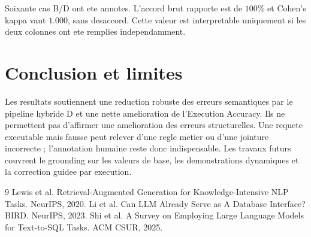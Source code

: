 \documentclass[11pt,a4paper]{article}
\begin{document}
Soixante cas B/D ont ete annotes. L'accord brut rapporte est de $100\%$ et
Cohen's kappa vaut $1.000$, sans desaccord. Cette valeur est interpretable
uniquement si les deux colonnes ont ete remplies independamment.

\section{Conclusion et limites}
Les resultats soutiennent une reduction robuste des erreurs semantiques par le
pipeline hybride D et une nette amelioration de l'Execution Accuracy. Ils ne
permettent pas d'affirmer une amelioration des erreurs structurelles. Une
requete executable mais fausse peut relever d'une regle metier ou d'une
jointure incorrecte ; l'annotation humaine reste donc indispensable. Les
travaux futurs couvrent le grounding sur les valeurs de base, les
demonstrations dynamiques et la correction guidee par execution.

\begin{thebibliography}{9}
 Lewis et al. Retrieval-Augmented Generation for Knowledge-Intensive NLP Tasks. NeurIPS, 2020.
 Li et al. Can LLM Already Serve as A Database Interface? BIRD. NeurIPS, 2023.
 Shi et al. A Survey on Employing Large Language Models for Text-to-SQL Tasks. ACM CSUR, 2025.
\end{thebibliography}
\end{document}
